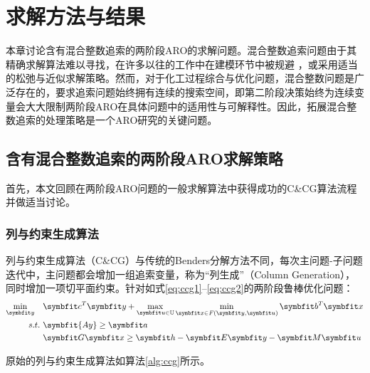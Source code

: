 
\chapter{求解方法与结果}

本章讨论含有混合整数追索的两阶段ARO的求解问题。混合整数追索问题由于其精确求解算法难以寻找，在许多以往的工作中在建模环节中被规避
，或采用适当的松弛与近似求解策略。然而，对于化工过程综合与优化问题，混合整数问题是广泛存在的，要求追索问题始终拥有连续的搜索空间，即第二阶段决策始终为连续变量会大大限制两阶段ARO在具体问题中的适用性与可解释性。因此，拓展混合整数追索的处理策略是一个ARO研究的关键问题。

\section{含有混合整数追索的两阶段ARO求解策略}
\label{section:solution}
首先，本文回顾在两阶段ARO问题的一般求解算法中获得成功的C\&CG算法流程并做适当讨论。

\subsection{列与约束生成算法}

列与约束生成算法（C\&CG）与传统的Benders分解方法不同，每次主问题-子问题迭代中，主问题都会增加一组追索变量，称为“列生成”（Column Generation），同时增加一项切平面约束。针对如式\eqref{eq:ccg1}--\eqref{eq:ccg2}的两阶段鲁棒优化问题：
\begin{align}
  \min_{\symbfit y}\quad &\symbfit c^T\symbfit y + \max_{\symbfit u\in\mathbb U} \min_{\symbfit x\in \mathit F(\symbfit y, \symbfit u)} \symbfit b^T \symbfit x \label{eq:ccg1}\\
   s.t.\ & \symbfit{Ay}\ge \symbfit a \\
   &  \symbfit G \symbfit x \ge \symbfit h - \symbfit E \symbfit y - \symbfit M \symbfit u\label{eq:ccg2}
\end{align}

原始的列与约束生成算法如算法\ref{alg:ccg}所示。
\label{section:ccg}

